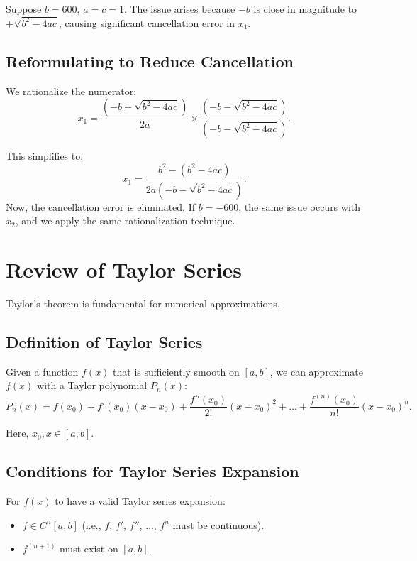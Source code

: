 \documentclass[12pt]{article}
\begin{document}
Suppose $b = 600$, $a = c = 1$. The issue arises because $-b$ is close in 
magnitude to $+\sqrt{b^2 - 4ac}$, causing significant cancellation error in 
$x_1$.

\subsection{Reformulating to Reduce Cancellation}

We rationalize the numerator:
\begin{equation*}
    x_1 = \frac{(-b + \sqrt{b^2 - 4ac})}{2a} \times 
          \frac{(-b - \sqrt{b^2 - 4ac})}{(-b - \sqrt{b^2 - 4ac})}.
\end{equation*}

This simplifies to:
\begin{equation*}
    x_1 = \frac{b^2 - (b^2 - 4ac)}{2a(-b - \sqrt{b^2 - 4ac})}.
\end{equation*}
Now, the cancellation error is eliminated. If $b = -600$, the same issue 
occurs with $x_2$, and we apply the same rationalization technique.

\section{Review of Taylor Series}

Taylor’s theorem is fundamental for numerical approximations.

\subsection{Definition of Taylor Series}

Given a function $f(x)$ that is sufficiently smooth on $[a, b]$, we can 
approximate $f(x)$ with a Taylor polynomial $P_n(x)$:
\begin{equation*}
    P_n(x) = f(x_0) + f'(x_0)(x - x_0) + \frac{f''(x_0)}{2!} (x - x_0)^2 + 
             \dots + \frac{f^{(n)}(x_0)}{n!} (x - x_0)^n.
\end{equation*}

Here, $x_0, x \in [a, b]$.

\subsection{Conditions for Taylor Series Expansion}

For $f(x)$ to have a valid Taylor series expansion:
\begin{itemize}
    \item $f \in C^n[a, b]$ (i.e., $f$, $f'$, $f''$, ..., $f^n$ must be continuous).
    \item $f^{(n+1)}$ must exist on $[a, b]$.
\end{itemize}
\end{document}
